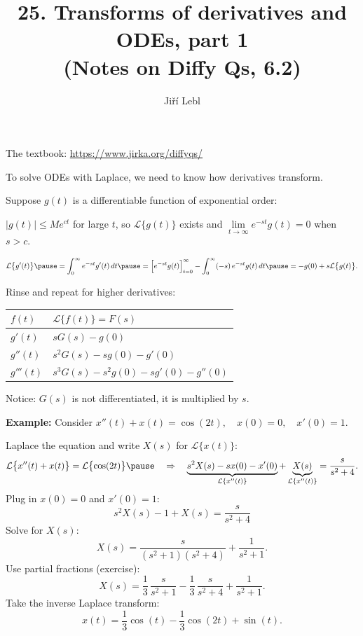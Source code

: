 \documentclass[10pt,aspectratio=169]{beamer}
\author{Ji\v{r}\'i Lebl}
\institute[OSU]{%
Oklahoma State University%
}
\title{25. Transforms of derivatives and ODEs, part 1\\(Notes on Diffy Qs, 6.2)}
\date{}
\begin{document}
\begin{frame}
\titlepage


\begin{center}
The textbook: \url{https://www.jirka.org/diffyqs/}
\end{center}
\end{frame}

\begin{frame}
To solve ODEs with Laplace, we need to know how derivatives transform.

\medskip
\pause

Suppose $g(t)$ is a differentiable function of exponential order:

\medskip
\pause

$\lvert g(t) \rvert \leq M e^{ct}$ for large $t$,
\qquad
so $\mathcal{L} \bigl\{ g(t) \bigr\}$ exists
\quad
and
\qquad
 $\lim\limits_{t\to\infty} e^{-st}g(t) = 0$ when $s > c$.

\pause
\[
\mathcal{L} \bigl\{ g'(t) \bigr\}
\pause
=
\int_0^\infty
e^{-st}
g'(t) \,dt
\pause
=
\Bigl[e^{-st} g(t) \Bigr]_{t=0}^\infty
-
\int_0^\infty
(-s)\,
e^{-st}
g(t) \,dt
\pause
=
-g(0) + s \mathcal{L} \bigl\{ g(t) \bigr\} .
\]
\pause

Rinse and repeat for higher derivatives:
\begin{center}
\begin{tabular}{@{}ll@{}}
\toprule
$f(t)$ & $\mathcal{L} \bigl\{ f(t) \bigr\} = F(s)$ \\
\midrule
$g'(t)$ & $sG(s)-g(0)$ \\[4pt]
$g''(t)$ & $s^2G(s)-sg(0)-g'(0)$ \\[4pt]
$g'''(t)$ & $s^3G(s)-s^2g(0)-sg'(0)-g''(0)$ \\[4pt]
\bottomrule
\end{tabular}
\end{center}
\pause
Notice: $G(s)$ is not differentiated, it is multiplied by $s$.

\end{frame}

\begin{frame}
\textbf{Example:}
Consider
\qquad
$x''(t) + x(t) = \cos (2t), \quad x(0) = 0, \quad x'(0) = 1$.

\medskip
\pause

Laplace the equation and write $X(s)$ for $\mathcal{L}\bigl\{x(t)\bigr\}$:
\[
\mathcal{L} \bigl\{ x''(t) + x(t) \bigr\}
= \mathcal{L} \bigl\{ \cos (2t) \bigr\}
\pause
\quad
\Rightarrow
\quad
\underbrace{s^2 X(s) -sx(0)-x'(0)}_{\mathcal{L}\{x''(t)\}}
+ \underbrace{X(s)}_{\mathcal{L}\{x''(t)\}}
= \frac{s}{s^2 + 4} .
\]
\pause
Plug in $x(0)=0$ and $x'(0)=1$:
\[
s^2 X(s) -1 + X(s) = \dfrac{s}{s^2 + 4}
\]
\pause
Solve for $X(s)$:
\[
X(s) = \frac{s}{(s^2+1)(s^2 + 4)} + \frac{1}{s^2+1} .
\]
\pause
Use partial fractions (exercise):
\[
X(s) =\frac{1}{3} \, \frac{s}{s^2+1} - 
\frac{1}{3}\, \frac{s}{s^2+4} + \frac{1}{s^2+1} .
\]
\pause
Take the inverse Laplace transform:
\[
x(t) =\frac{1}{3}  \cos (t) -
\frac{1}{3} \cos (2t) + \sin (t) .
\]
\end{frame}
\end{document}
